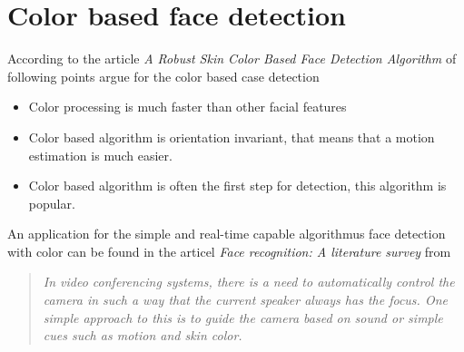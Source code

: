 \documentclass[Bachelorarbeit.tex]{subfiles}
\begin{document}
\section{Color based face detection} \label{cbFd}
According to the article \textit{A Robust Skin Color Based Face Detection Algorithm} of \cite{RobustSkinColorFD} following points argue for the color based case detection
\begin{itemize}
\item Color processing is much faster than other facial features
\item Color based algorithm is orientation invariant, that means that a motion estimation is much easier.
\item Color based algorithm is often the first step for detection, this algorithm is popular.
\end{itemize}

An application for the simple and real-time capable algorithmus face detection with color can be found in the articel  \textit{Face recognition: A literature survey} from \cite{FRLiteratureSurvey}
\begin{quotation}
\textit{In video conferencing systems, there is a need to automatically control the camera in
such a way that the current speaker always has the focus. One simple approach to this
is to guide the camera based on sound or simple cues such as motion and skin color.}
\end{quotation}
\end{document}

